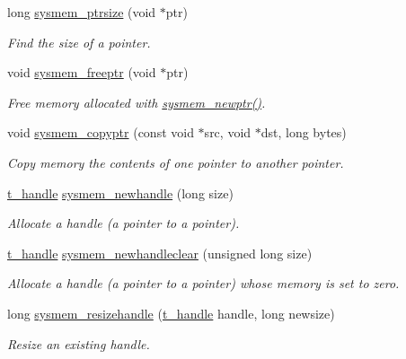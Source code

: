 \begin{DoxyCompactItemize}
long \hyperlink{group__memory_ga4f847713a1bd083030d60e8752d7c28d}{sysmem\_\-ptrsize} (void $\ast$ptr)
\begin{DoxyCompactList}\small\item\em Find the size of a pointer. \item\end{DoxyCompactList}\item 
void \hyperlink{group__memory_ga200c82639e547869db1f3887d17102d3}{sysmem\_\-freeptr} (void $\ast$ptr)
\begin{DoxyCompactList}\small\item\em Free memory allocated with \hyperlink{group__memory_ga276676be214edff9fe5c9d0681f39ae6}{sysmem\_\-newptr()}. \item\end{DoxyCompactList}\item 
void \hyperlink{group__memory_ga527cceb7178a110b73ca01fdc41702b4}{sysmem\_\-copyptr} (const void $\ast$src, void $\ast$dst, long bytes)
\begin{DoxyCompactList}\small\item\em Copy memory the contents of one pointer to another pointer. \item\end{DoxyCompactList}\item 
\hyperlink{group__datatypes_ga0fe64aac41fd3ec071cce295a41d67ad}{t\_\-handle} \hyperlink{group__memory_gacdacfad4785c71dc8c4ce5d4d9714d54}{sysmem\_\-newhandle} (long size)
\begin{DoxyCompactList}\small\item\em Allocate a handle (a pointer to a pointer). \item\end{DoxyCompactList}\item 
\hyperlink{group__datatypes_ga0fe64aac41fd3ec071cce295a41d67ad}{t\_\-handle} \hyperlink{group__memory_ga56406e70880d954e3d51b87e606c1398}{sysmem\_\-newhandleclear} (unsigned long size)
\begin{DoxyCompactList}\small\item\em Allocate a handle (a pointer to a pointer) whose memory is set to zero. \item\end{DoxyCompactList}\item 
long \hyperlink{group__memory_ga420520dda6015ec33876b18b860083dd}{sysmem\_\-resizehandle} (\hyperlink{group__datatypes_ga0fe64aac41fd3ec071cce295a41d67ad}{t\_\-handle} handle, long newsize)
\begin{DoxyCompactList}\small\item\em Resize an existing handle. \item\end{DoxyCompactList}\item 

\end{DoxyCompactItemize}
